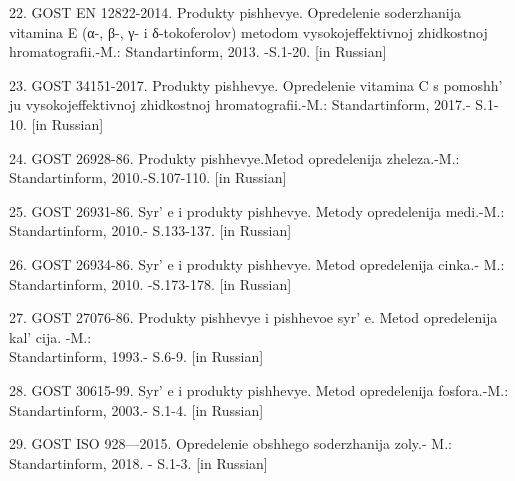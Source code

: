 \begin{references}
22. GOST EN 12822-2014. Produkty pishhevye. Opredelenie soderzhanija
vitamina E (α-, β-, γ- i δ-tokoferolov) metodom vysokojeffektivnoj
zhidkostnoj hromatografii.-M.: Standartinform, 2013. -S.1-20. {[}in
Russian{]}

23. GOST 34151-2017. Produkty pishhevye. Opredelenie vitamina C s
pomoshh' ju vysokojeffektivnoj zhidkostnoj
hromatografii.-M.: Standartinform, 2017.- S.1-10. {[}in Russian{]}

24. GOST 26928-86. Produkty pishhevye.Metod opredelenija zheleza.-M.:
Standartinform, 2010.-S.107-110. {[}in Russian{]}

25. GOST 26931-86. Syr' e i produkty pishhevye. Metody
opredelenija medi.-M.: Standartinform, 2010.- S.133-137. {[}in
Russian{]}

26. GOST 26934-86. Syr' e i produkty pishhevye. Metod
opredelenija cinka.- M.: Standartinform, 2010. -S.173-178. {[}in
Russian{]}

27. GOST 27076-86. Produkty pishhevye i pishhevoe syr' e.
Metod opredelenija kal' cija. -M.: \\Standartinform, 1993.-
S.6-9. {[}in Russian{]}

28. GOST 30615-99. Syr' e i produkty pishhevye. Metod
opredelenija fosfora.-M.: Standartinform, 2003.- S.1-4. {[}in
Russian{]}

29. GOST ISO 928---2015. Opredelenie obshhego soderzhanija zoly.- M.:
Standartinform, 2018. - S.1-3. {[}in Russian{]}
\end{references}

